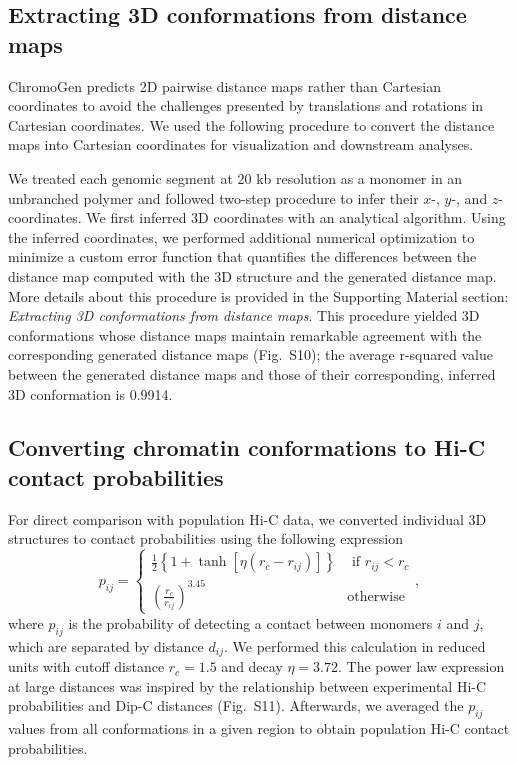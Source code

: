 \documentclass[12pt,letterpaper]{article}
\begin{document}
\subsection*{Extracting 3D conformations from distance maps}

ChromoGen predicts 2D pairwise distance maps rather than Cartesian coordinates to avoid the challenges presented by translations and rotations in Cartesian coordinates. We used the following procedure to convert the distance maps into Cartesian coordinates for visualization and downstream analyses.  


We treated each genomic segment at 20 kb resolution as a monomer in an unbranched polymer and followed two-step procedure to infer their $x$-, $y$-, and $z$-coordinates. We first inferred 3D coordinates with an analytical algorithm. Using the inferred coordinates, we performed additional numerical optimization to minimize a custom error function that quantifies the differences between the distance map computed with the 3D structure and the generated distance map. More details about this procedure is provided in the Supporting Material section: \emph{Extracting 3D conformations from distance maps}. This procedure yielded 3D conformations whose distance maps maintain remarkable agreement with the corresponding generated distance maps (Fig.~S10); the average r-squared value between the generated distance maps and those of their corresponding, inferred 3D conformation is 0.9914. 


\subsection*{Converting chromatin conformations to Hi-C contact probabilities}
\label{sec:dist_to_hic}

For direct comparison with population Hi-C data, we converted individual 3D structures to contact probabilities using the following expression 
\begin{equation}
    \label{eq:dist_to_prob}
    p_{ij} = 
    \begin{cases}
        \tfrac{1}{2}\left\{ 1 + \tanh[\eta(r_c-r_{ij})] \right\} & \text{ if } r_{ij} < r_c \\
        \left( \frac{r_c}{r_{ij}} \right)^{3.45} & \text{otherwise}
    \end{cases}
    ,
\end{equation}
where $p_{ij}$ is the probability of detecting a contact between monomers $i$ and $j$, which are separated by distance $d_{ij}$. We performed this calculation in reduced units with cutoff distance $r_c=1.5$ and decay $\eta=3.72$. The power law expression at large distances was inspired by the relationship between experimental Hi-C probabilities and Dip-C distances (Fig.~S11). Afterwards, we averaged the $p_{ij}$ values from all conformations in a given region to obtain population Hi-C contact probabilities. 
\end{document}
